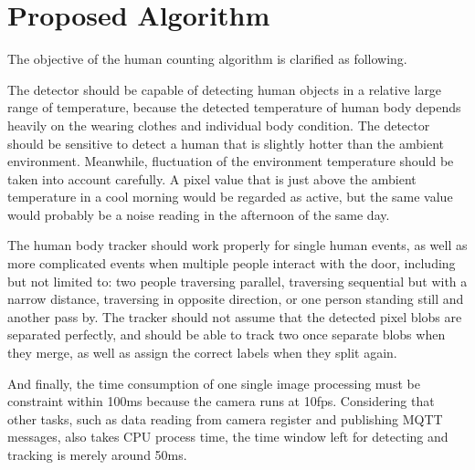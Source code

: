 \chapter{Proposed Algorithm}\label{ch:algorithm}
The objective of the human counting algorithm is clarified as following.

The detector should be capable of detecting human objects in a relative large range of temperature, because the detected temperature of human body depends heavily on the wearing clothes and individual body condition. The detector should be sensitive to detect a human that is slightly hotter than the ambient environment. Meanwhile, fluctuation of the environment temperature should be taken into account carefully. A pixel value that is just above the ambient temperature in a cool morning would be regarded as active, but the same value would probably be a noise reading in the afternoon of the same day.

The human body tracker should work properly for single human events, as well as more complicated events when multiple people interact with the door, including but not limited to: two people traversing parallel, traversing sequential but with a narrow distance, traversing in opposite direction, or one person standing still and another pass by. The tracker should not assume that the detected pixel blobs are separated perfectly, and should be able to track two once separate blobs when they merge, as well as assign the correct labels when they split again.

And finally, the time consumption of one single image processing must be constraint within 100ms because the camera runs at 10fps. Considering that other tasks, such as data reading from camera register and publishing MQTT messages, also takes CPU process time, the time window left for detecting and tracking is merely around 50ms.

